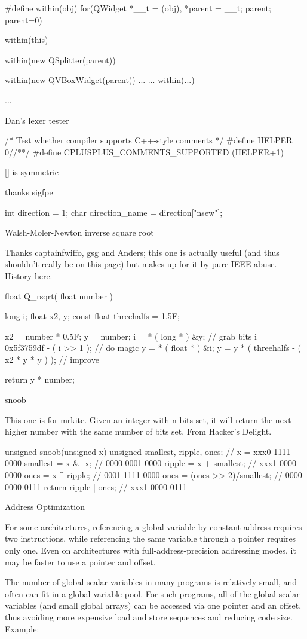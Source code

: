 {{{{{{{#define within(obj) for(QWidget *__t = (obj), *parent = __t; parent; parent=0)

within(this) {
  within(new QSplitter(parent)) {
     within(new QVBoxWidget(parent)) { 
       ...
       ...
     }
     within(...) {
  ...

Dan's lexer tester

/* Test whether compiler supports C++-style comments */
#define HELPER 0//**/ 
#define CPLUSPLUS_COMMENTS_SUPPORTED (HELPER+1)

[] is symmetric

thanks sigfpe

int direction = 1;
char direction_name = direction["nsew"];

Walsh-Moler-Newton inverse square root

Thanks captainfwiffo, gsg and Anders; this one is actually useful (and thus shouldn't really be on this page) but makes up for it by pure IEEE abuse. History here.

float Q_rsqrt( float number )
{
  long i;
  float x2, y;
  const float threehalfs = 1.5F;

  x2 = number * 0.5F;
  y  = number;
  i  = * ( long * ) &y;                       // grab bits
  i  = 0x5f3759df - ( i >> 1 );               // do magic
  y  = * ( float * ) &i;
  y  = y * ( threehalfs - ( x2 * y * y ) );   // improve

  return y * number;
}

 snoob

This one is for mrkite. Given an integer with n bits set, it will return the next higher number with the same number of bits set. From Hacker's Delight.

unsigned snoob(unsigned x) {
   unsigned smallest, ripple, ones;
                                // x = xxx0 1111 0000
   smallest = x & -x;           //     0000 0001 0000
   ripple = x + smallest;       //     xxx1 0000 0000
   ones = x ^ ripple;           //     0001 1111 0000
   ones = (ones >> 2)/smallest; //     0000 0000 0111
   return ripple | ones;        //     xxx1 0000 0111
}

Address Optimization

For some architectures, referencing a global variable by constant address requires two instructions, while referencing the same variable through a pointer requires only one. Even on architectures with full-address-precision addressing modes, it may be faster to use a pointer and offset.

The number of global scalar variables in many programs is relatively small, and often can fit in a global variable pool. For such programs, all of the global scalar variables (and small global arrays) can be accessed via one pointer and an offset, thus avoiding more expensive load and store sequences and reducing code size.
Example:

}}}}}}}}}}
